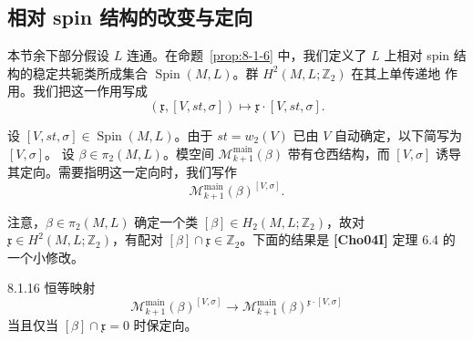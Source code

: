 
\subsection{相对 spin 结构的改变与定向}
\label{subsec:8-1-4}

本节余下部分假设 $L$ 连通。在命题~\ref{prop:8-1-6} 中，我们定义了
$L$ 上相对 spin 结构的稳定共轭类所成集合
$\operatorname{Spin}(M,L)$。群 $H^2(M,L;\mathbb Z_2)$ 在其上单传递地
作用。我们把这一作用写成
\[
 (\mathfrak x,[V,st,\sigma])
 \longmapsto \mathfrak x\cdot[V,st,\sigma].
\]

设 $[V,st,\sigma]\in\operatorname{Spin}(M,L)$。由于
$st=w_2(V)$ 已由 $V$ 自动确定，以下简写为 $[V,\sigma]$。
设 $\beta\in\pi_2(M,L)$。模空间
$\mathcal M^{\mathrm{main}}_{k+1}(\beta)$ 带有仓西结构，而
$[V,\sigma]$ 诱导其定向。需要指明这一定向时，我们写作
\[
 \mathcal M^{\mathrm{main}}_{k+1}(\beta)^{[V,\sigma]}.
\]

注意，$\beta\in\pi_2(M,L)$ 确定一个类
$[\beta]\in H_2(M,L;\mathbb Z_2)$，故对
$\mathfrak x\in H^2(M,L;\mathbb Z_2)$，有配对
$[\beta]\cap\mathfrak x\in\mathbb Z_2$。下面的结果是
\textbf{[Cho04I]} 定理 6.4 的一个小修改。

\begin{proposition}{8.1.16}\label{prop:8-1-16}
恒等映射
\[
 \mathcal M^{\mathrm{main}}_{k+1}(\beta)^{[V,\sigma]}
 \longrightarrow
 \mathcal M^{\mathrm{main}}_{k+1}(\beta)^{
   \mathfrak x\cdot[V,\sigma]}
\]
当且仅当 $[\beta]\cap\mathfrak x=0$ 时保定向。%
\end{proposition}


